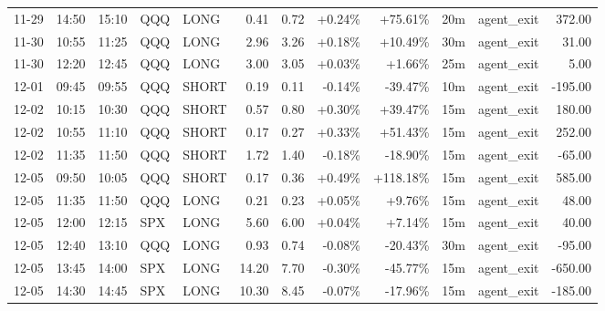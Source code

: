 \documentclass[11pt,a4paper]{article}
\begin{document}
\begin{center}
\begin{longtable}{>{\color{txtmain}}l l l l l r r r r r >{\color{txtmain}}l r}
11-29 & 14:50 & 15:10 & QQQ & LONG & 0.41 & 0.72 & \textcolor{wingreen}{+0.24\%} & \textcolor{wingreen}{+75.61\%} & 20m & agent\_exit & \textcolor{wingreen}{372.00} \\
11-30 & 10:55 & 11:25 & QQQ & LONG & 2.96 & 3.26 & \textcolor{wingreen}{+0.18\%} & \textcolor{wingreen}{+10.49\%} & 30m & agent\_exit & \textcolor{wingreen}{31.00} \\
11-30 & 12:20 & 12:45 & QQQ & LONG & 3.00 & 3.05 & \textcolor{wingreen}{+0.03\%} & \textcolor{wingreen}{+1.66\%} & 25m & agent\_exit & \textcolor{wingreen}{5.00} \\
12-01 & 09:45 & 09:55 & QQQ & SHORT & 0.19 & 0.11 & \textcolor{lossred}{-0.14\%} & \textcolor{lossred}{-39.47\%} & 10m & agent\_exit & \textcolor{lossred}{-195.00} \\
12-02 & 10:15 & 10:30 & QQQ & SHORT & 0.57 & 0.80 & \textcolor{wingreen}{+0.30\%} & \textcolor{wingreen}{+39.47\%} & 15m & agent\_exit & \textcolor{wingreen}{180.00} \\
12-02 & 10:55 & 11:10 & QQQ & SHORT & 0.17 & 0.27 & \textcolor{wingreen}{+0.33\%} & \textcolor{wingreen}{+51.43\%} & 15m & agent\_exit & \textcolor{wingreen}{252.00} \\
12-02 & 11:35 & 11:50 & QQQ & SHORT & 1.72 & 1.40 & \textcolor{lossred}{-0.18\%} & \textcolor{lossred}{-18.90\%} & 15m & agent\_exit & \textcolor{lossred}{-65.00} \\
12-05 & 09:50 & 10:05 & QQQ & SHORT & 0.17 & 0.36 & \textcolor{wingreen}{+0.49\%} & \textcolor{wingreen}{+118.18\%} & 15m & agent\_exit & \textcolor{wingreen}{585.00} \\
12-05 & 11:35 & 11:50 & QQQ & LONG & 0.21 & 0.23 & \textcolor{wingreen}{+0.05\%} & \textcolor{wingreen}{+9.76\%} & 15m & agent\_exit & \textcolor{wingreen}{48.00} \\
12-05 & 12:00 & 12:15 & SPX & LONG & 5.60 & 6.00 & \textcolor{wingreen}{+0.04\%} & \textcolor{wingreen}{+7.14\%} & 15m & agent\_exit & \textcolor{wingreen}{40.00} \\
12-05 & 12:40 & 13:10 & QQQ & LONG & 0.93 & 0.74 & \textcolor{lossred}{-0.08\%} & \textcolor{lossred}{-20.43\%} & 30m & agent\_exit & \textcolor{lossred}{-95.00} \\
12-05 & 13:45 & 14:00 & SPX & LONG & 14.20 & 7.70 & \textcolor{lossred}{-0.30\%} & \textcolor{lossred}{-45.77\%} & 15m & agent\_exit & \textcolor{lossred}{-650.00} \\
12-05 & 14:30 & 14:45 & SPX & LONG & 10.30 & 8.45 & \textcolor{lossred}{-0.07\%} & \textcolor{lossred}{-17.96\%} & 15m & agent\_exit & \textcolor{lossred}{-185.00} \\

\end{longtable}
\end{center}
\end{document}
